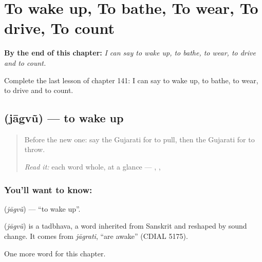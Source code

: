 
\chapter{To wake up, To bathe, To wear, To drive, To count}
\label{ch:gu-to-wake-up-to-bathe-to-wear-to-drive-to-count}

\begin{chapteropening}
\textbf{By the end of this chapter:} \emph{I can say to wake up, to bathe, to wear, to drive and to count.}

Complete the last lesson of chapter 141: I can say to wake up, to bathe, to wear, to drive and to count.
\end{chapteropening}

\section[\texorpdfstring{\gu{જાગવું} (jāgvũ)}{જાગવું (jāgvũ)}]{ (jāgvũ) — to wake up}

\label{lesson:GU-C141-jagvu}



\begin{quote}
Before the new one: say the Gujarati for to pull, then the Gujarati for to throw.

\emph{Read it:} each word whole, at a glance — \textbf{}, \textbf{}, \textbf{}
\end{quote}

\subsection*{You'll want to know: }
\textbf{} (\emph{jāgvũ}) — \textquotedblleft{}to wake up\textquotedblright{}.

\begin{cousinweb}
\textbf{} (\emph{jāgvũ}) is a tadbhava, a word inherited from Sanskrit and reshaped by sound change. It comes from \emph{jāgrati}, \textquotedblleft{}are awake\textquotedblright{} (CDIAL 5175).
\end{cousinweb}

\begin{grammarlens}[title={What you've built}]
One more word for this chapter.
\end{grammarlens}

